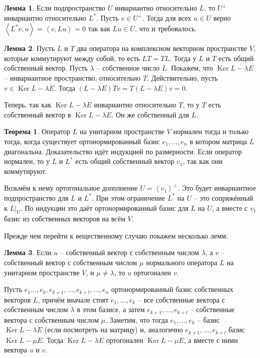 \documentclass[10pt,a4paper,oneside]{book} %
\theoremstyle{definition}
\newtheorem{thm}{Теорема}
\newtheorem{lem}{Лемма}
\DeclareMathOperator{\Ker}{Ker}
\def\lan{\left\langle }
\def\ran{\right\rangle}
\def\thrm{\begin{thm}}
\def\ethrm{\end{thm}}
\def\lm{\begin{lem}}
\def\elm{\end{lem}}
\begin{document}
\lm Если подпространство $U$ инвариантно относительно $L$, то $U^{\bot}$ инвариантно относительно $L^{*}$.
\proof Пусть $v\in U^{\bot}$. Тогда для всех $u\in U$ верно $\lan L^* v, u\ran = \lan v, Lu\ran =0 $ так как $Lu\in U$, что и требовалось.
\endproof
\elm

\lm Пусть $L$ и $T$ два оператора на комплексном векторном пространстве $V$, которые коммутируют между собой, то есть $LT=TL$. Тогда у $L$ и $T$ есть общий собственный вектор. 
\proof Пусть $\lambda$ -- собственное число $L$. Покажем, что $\Ker L -\lambda E$ -- инвариантное пространство, относительно $T$. Действительно, пусть $v\in \Ker L-\lambda E$. Тогда $(L-\lambda E)Tv=T(L-\lambda E)v=0$.

Теперь, так как $\Ker L-\lambda E$ инвариантно относительно $T$, то у $T$ есть собственный вектор в $\Ker L-\lambda E$. Он же собственный для $L$.
\endproof
\elm

\thrm 
Оператор $L$ на  унитарном пространстве $V$ нормален тогда и только тогда, когда существует ортонормированный базис $e_1,\dots,e_n$ в котором матрица $L$ диагональна.
\proof
Доказательство идёт индукцией по размерности. Если оператор нормален, то у $L$ и $L^*$ есть общий собственный вектор $v_1$, так как они коммутируют.

Возьмём к нему ортогональное дополнение $U=\lan v_1\ran^{\bot}$. Это будет инвариантное подпространство для $L$ и $L^*$. При этом ограничение $L^*$ на $U$ -- это сопряжённый к $L|_U$. По индукции это даёт ортонормированный базис для $L$ на $U$, а вместе с $v_1$ базис из собственных векторов на всём $V$.
\endproof
\ethrm


Прежде чем перейти к вещественному случаю покажем несколько лемм.

\lm Если $u$ -- собственный вектор с собственным числом $\lambda$, а $v$ -- собственный вектор с собственным числом $\mu$ нормального оператора $L$ на унитарном пространстве $V$, и $\mu\neq \lambda$, то $u$ ортогонален $v$. 
\elm
\proof Пусть $e_1\dots,e_k, e_{k+1},\dots,e_{k+l}, \dots,e_n$ ортонормированный базис собственных векторов $L$, причём вначале стоят  $e_1,\dots,e_k$ -- все собственные вектора с собственным числом $\lambda$ в этом базисе, а затем $e_{k+1},\dots,e_{k+l}$ -- собственные вектора с собственным числом $\mu$. Заметим, что тогда $e_1,\dots,e_k$ -- базис $\Ker L - \lambda E$ (если посмотреть на матрицу) и, аналогично $e_{k+1},\dots,e_{k+l}$ базис $\Ker L- \mu E$. Тогда  $\Ker L - \lambda E$ ортогонален $\Ker L- \mu E$, а вместе с ними вектора $u$ и $v$.
\endproof
\end{document}
